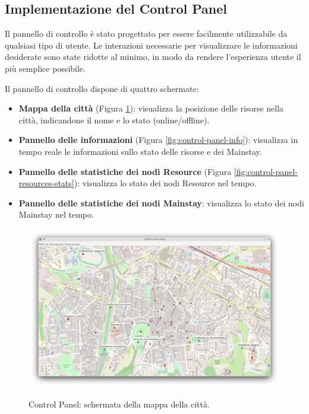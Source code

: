 \documentclass{scrartcl}
\begin{document}
\subsection{Implementazione del Control Panel}

Il pannello di controllo è stato progettato per essere facilmente utilizzabile da qualsiasi tipo di utente. Le interazioni necessarie per visualizzare le informazioni desiderate sono state ridotte al minimo, in modo da rendere l'esperienza utente il più semplice possibile.

Il pannello di controllo dispone di quattro schermate:

\begin{itemize}
    \item \textbf{Mappa della città} (Figura \ref{fig:control-panel-map}): visualizza la posizione delle risorse nella città, indicandone il nome e lo stato (online/offline).
    \item \textbf{Pannello delle informazioni} (Figura \ref{fig:control-panel-info}): visualizza in tempo reale le informazioni sullo stato delle risorse e dei Mainstay.
    \item \textbf{Pannello delle statistiche dei nodi Resource} (Figura \ref{fig:control-panel-resources-stats}): visualizza lo stato dei nodi Resource nel tempo.
    \item \textbf{Pannello delle statistiche dei nodi Mainstay}: visualizza lo stato dei nodi Mainstay nel tempo.
\end{itemize}

\begin{figure}[H]
    \caption{Control Panel: schermata della mappa della città.}
    \includegraphics[width=\textwidth]{../assets/images/control-panel-map.png}
    \label{fig:control-panel-map}
\end{figure}
\end{document}
